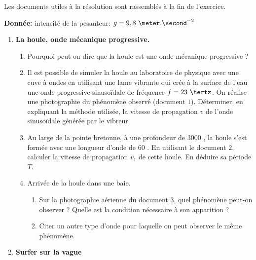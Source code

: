Les documents utiles à la résolution sont rassemblés à la fin de l'exercice.

\vspace{0.3cm}

\textbf{Donnée: }intensité de la pesanteur: $g = 9,8\text{ }\meter.\second^{-2}$

\begin{enumerate}

\item \textbf{La houle, onde mécanique progressive.}

\begin{enumerate}[label=(\alph*)]
\item Pourquoi peut-on dire que la houle est une onde mécanique progressive ?
\item Il est possible de simuler la houle au laboratoire de physique avec une cuve à ondes en utilisant une lame vibrante qui crée à la surface de l'eau une onde progressive sinusoïdale de fréquence $f = 23\text{ }\hertz$. On réalise une photographie du phénomène observé (document $1$).\newline
Déterminer, en expliquant la méthode utilisée, la vitesse de propagation $v$ de l'onde sinusoïdale générée par le vibreur.
\item Au large de la pointe bretonne, à une profondeur de $3000$ \meter, la houle s'est formée avec une longueur d'onde de $60$ \meter. En utilisant le document $2$, calculer la vitesse de propagation $v_{1}$ de cette houle. En déduire sa période $T$.

\item Arrivée de la houle dans une baie.

\begin{enumerate}
\item Sur la photographie aérienne du document $3$, quel phénomène peut-on observer ? Quelle est la condition nécessaire à son apparition ?
\item Citer un autre type d'onde pour laquelle on peut observer le même phénomène.
\end{enumerate}

\end{enumerate}

\item \textbf{Surfer sur la vague}


\end{enumerate}
